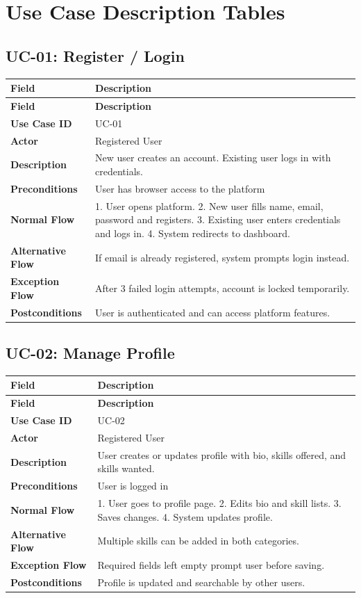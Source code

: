 \documentclass[12pt,a4paper]{article}
\begin{document}
\newpage
\section{Use Case Description Tables}
\vspace{4pt}

\subsection*{UC-01: Register / Login}
\begin{longtable}{>{\bfseries}L{3.5cm} L{10cm}}
\toprule
\textbf{Field} & \textbf{Description} \\ \midrule \endfirsthead \midrule \textbf{Field} & \textbf{Description} \\ \midrule \endhead \bottomrule \endfoot
Use Case ID      & UC-01 \\
Actor            & Registered User \\
Description      & New user creates an account. Existing user logs in with credentials. \\
Preconditions    & User has browser access to the platform \\
Normal Flow      & 1. User opens platform. 2. New user fills name, email, password and registers. 3. Existing user enters credentials and logs in. 4. System redirects to dashboard. \\
Alternative Flow & If email is already registered, system prompts login instead. \\
Exception Flow   & After 3 failed login attempts, account is locked temporarily. \\
Postconditions   & User is authenticated and can access platform features. \\
\end{longtable}

\subsection*{UC-02: Manage Profile}
\begin{longtable}{>{\bfseries}L{3.5cm} L{10cm}}
\toprule
\textbf{Field} & \textbf{Description} \\ \midrule \endfirsthead \midrule \textbf{Field} & \textbf{Description} \\ \midrule \endhead \bottomrule \endfoot
Use Case ID      & UC-02 \\
Actor            & Registered User \\
Description      & User creates or updates profile with bio, skills offered, and skills wanted. \\
Preconditions    & User is logged in \\
Normal Flow      & 1. User goes to profile page. 2. Edits bio and skill lists. 3. Saves changes. 4. System updates profile. \\
Alternative Flow & Multiple skills can be added in both categories. \\
Exception Flow   & Required fields left empty prompt user before saving. \\
Postconditions   & Profile is updated and searchable by other users. \\
\end{longtable}
\end{document}
